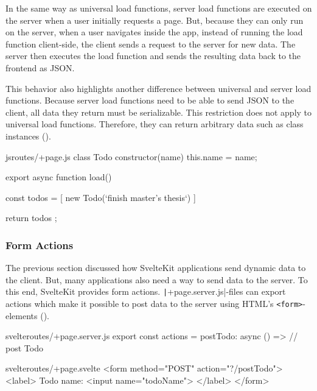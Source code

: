 In the same way as universal load functions, server load functions are executed on the server when a user initially requests a page. But, because they can only run on the server, when a user navigates inside the app, instead of running the load function client-side, the client sends a request to the server for new data. The server then executes the load function and sends the resulting data back to the frontend as JSON.

This behavior also highlights another difference between universal and server load functions. Because server load functions need to be able to send JSON to the client, all data they return must be serializable. This restriction does not apply to universal load functions. Therefore, they can return arbitrary data such as class instances ().

\begin{listing}[h!]
\begin{myminted}{js}{routes/+page.js}
class Todo {
  constructor(name) {
    this.name = name;
  }
}

export async function load() {
  const todos =  [ new Todo(`finish master's thesis`) ]

  return { todos };
}
\end{myminted}
\caption{Universal load function that returns non-serializable data.}
\label{fig:sveltekit-universal-load}
\end{listing}

\subsubsection{Form Actions}
\label{sec:sveltekit-server-actions}

The previous section discussed how SvelteKit applications send dynamic data to the client. But, many applications also need a way to send data to the server. To this end, SvelteKit provides form actions. \texttt|+page.server.js|-files can export actions which make it possible to post data to the server using HTML's \texttt{<form>}-elements ().

\begin{listing}[h!]
\begin{myminted}{svelte}{routes/+page.server.js}
export const actions = {
  postTodo: async () => {
    // post Todo
  }
}
\end{myminted}
\begin{myminted}{svelte}{routes/+page.svelte}
<form method="POST" action="?/postTodo">
  <label>
    Todo name:
    <input name="todoName">
  </label>
</form>
\end{myminted}
\caption{Example server action to post a new to-do.}
\label{fig:sveltekit-server-action}
\end{listing}

